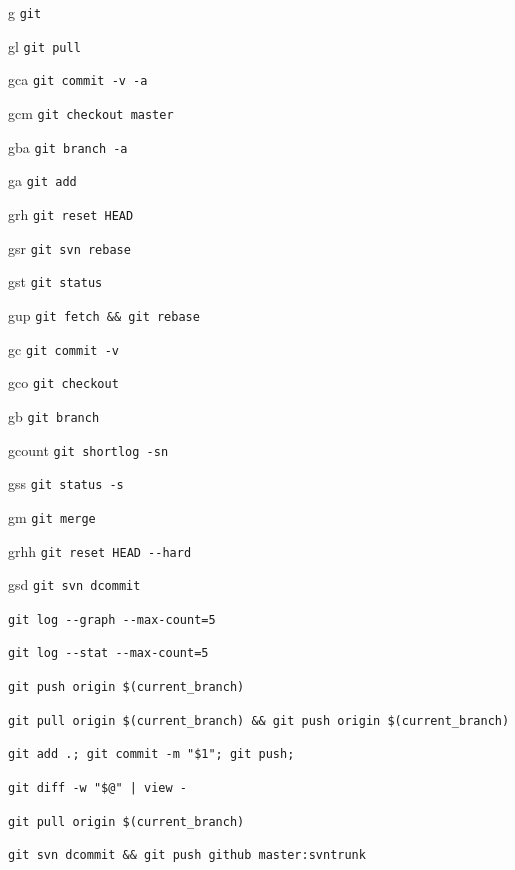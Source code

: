 \documentclass[12pt,a4paper]{article}
\begin{document}
				\begin{description}[leftmargin=3cm, style=sameline]
					\begin{multicols}{2}
						\item[g]{\lstinline!git!}
						\item[gl]{\lstinline!git pull!}
						\item[gca]{\lstinline!git commit -v -a!}
						\item[gcm]{\lstinline!git checkout master!}
						\item[gba]{\lstinline!git branch -a!}
						\item[ga]{\lstinline!git add!}
						\item[grh]{\lstinline!git reset HEAD!}
						\item[gsr]{\lstinline!git svn rebase!}
						\item[gst]{\lstinline!git status!}
						\item[gup]{\lstinline!git fetch && git rebase!}
						\item[gc]{\lstinline!git commit -v!}
						\item[gco]{\lstinline!git checkout!}
						\item[gb]{\lstinline!git branch!}
						\item[gcount]{\lstinline!git shortlog -sn!}
						\item[gss]{\lstinline!git status -s!}
						\item[gm]{\lstinline!git merge!}
						\item[grhh]{\lstinline!git reset HEAD --hard!}
						\item[gsd]{\lstinline!git svn dcommit!}
					\end{multicols}
					\item[glgg]{\lstinline!git log --graph --max-count=5!}
					\item[glg]{\lstinline!git log --stat --max-count=5!}
					\item[ggpush]{\lstinline!git push origin $(current_branch)!}
					\item[ggpnp]{\lstinline!git pull origin $(current_branch) && git push origin $(current_branch)!}
					\item[gpa]{\lstinline!git add .; git commit -m "$1"; git push;!}
					\item[gdv]{\lstinline!git diff -w "$@" | view -!}
					\item[ggpull]{\lstinline!git pull origin $(current_branch)!}
					\item[git-svn-dcommit-push]{\lstinline!git svn dcommit && git push github master:svntrunk!}
				\end{description}
\end{document}
